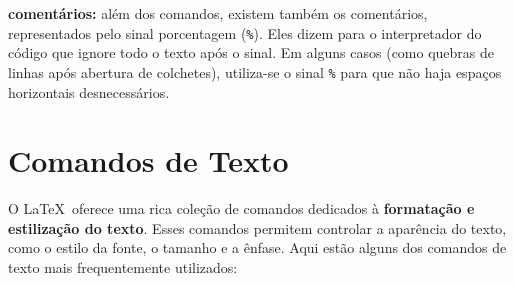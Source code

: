 \begin{alineas}
	\item \textbf{comentários:} além dos comandos, existem também os comentários, representados pelo sinal porcentagem (\texttt{\%}). Eles dizem para o interpretador do código que ignore todo o texto após o sinal. Em alguns casos (como quebras de linhas após abertura de colchetes), utiliza-se o sinal \texttt{\%} para que não haja espaços horizontais desnecessários.
\end{alineas}



\section{Comandos de Texto}

O \LaTeX\ oferece uma rica coleção de comandos dedicados à \textbf{formatação e estilização do texto}. Esses comandos permitem controlar a aparência do texto, como o estilo da fonte, o tamanho e a ênfase.
Aqui estão alguns dos comandos de texto mais frequentemente utilizados:

